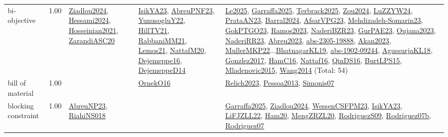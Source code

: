 {\begin{longtable}{p{3cm}r>{\raggedright\arraybackslash}p{6cm}>{\raggedright\arraybackslash}p{6cm}>{\raggedright\arraybackslash}p{8cm}}
\index{bi-objective}\index{Concepts!bi-objective}bi-objective &  1.00 & \hyperref[detail:Ziadlou2024]{Ziadlou2024}, \hyperref[detail:Hessami2024]{Hessami2024}, \hyperref[detail:Hosseinian2021]{Hosseinian2021}, \hyperref[detail:ZarandiASC20]{ZarandiASC20} & \hyperref[detail:IsikYA23]{IsikYA23}, \hyperref[detail:AbreuPNF23]{AbreuPNF23}, \hyperref[detail:YunusogluY22]{YunusogluY22}, \hyperref[detail:HillTV21]{HillTV21}, \hyperref[detail:RabbaniMM21]{RabbaniMM21}, \hyperref[detail:Lemos21]{Lemos21}, \hyperref[detail:NattafM20]{NattafM20}, \hyperref[detail:Dejemeppe16]{Dejemeppe16}, \hyperref[detail:DejemeppeD14]{DejemeppeD14} & \hyperref[detail:Le2025]{Le2025}, \hyperref[detail:Garraffa2025]{Garraffa2025}, \hyperref[detail:Terbrack2025]{Terbrack2025}, \hyperref[detail:Zou2024]{Zou2024}, \hyperref[detail:LuZZYW24]{LuZZYW24}, \hyperref[detail:PrataAN23]{PrataAN23}, \hyperref[detail:Barral2024]{Barral2024}, \hyperref[detail:AfsarVPG23]{AfsarVPG23}, \hyperref[detail:Mehdizadeh-Somarin23]{Mehdizadeh-Somarin23}, \hyperref[detail:GokPTGO23]{GokPTGO23}, \hyperref[detail:Ramos2023]{Ramos2023}, \hyperref[detail:NaderiBZR23]{NaderiBZR23}, \hyperref[detail:GurPAE23]{GurPAE23}, \hyperref[detail:Oujana2023]{Oujana2023}, \hyperref[detail:NaderiRR23]{NaderiRR23}, \hyperref[detail:Abreu2023]{Abreu2023}, \hyperref[detail:abs-2305-19888]{abs-2305-19888}, \hyperref[detail:Akan2023]{Akan2023}, \hyperref[detail:MullerMKP22]{MullerMKP22}...\hyperref[detail:BhatnagarKL19]{BhatnagarKL19}, \hyperref[detail:abs-1902-09244]{abs-1902-09244}, \hyperref[detail:AgussurjaKL18]{AgussurjaKL18}, \hyperref[detail:Gonzlez2017]{Gonzlez2017}, \hyperref[detail:HamC16]{HamC16}, \hyperref[detail:Nattaf16]{Nattaf16}, \hyperref[detail:QinDS16]{QinDS16}, \hyperref[detail:BurtLPS15]{BurtLPS15}, \hyperref[detail:Mladenovic2015]{Mladenovic2015}, \hyperref[detail:Wang2014]{Wang2014} (Total: 54)\\
\index{bill of material}\index{Concepts!bill of material}bill of material &  1.00 &  & \hyperref[detail:OrnekO16]{OrnekO16} & \hyperref[detail:Relich2023]{Relich2023}, \hyperref[detail:Pessoa2013]{Pessoa2013}, \hyperref[detail:Simonis07]{Simonis07}\\
\index{blocking constraint}\index{Concepts!blocking constraint}blocking constraint &  1.00 & \hyperref[detail:AbreuNP23]{AbreuNP23}, \hyperref[detail:RiahiNS018]{RiahiNS018} &  & \hyperref[detail:Garraffa2025]{Garraffa2025}, \hyperref[detail:Ziadlou2024]{Ziadlou2024}, \hyperref[detail:WessenCSFPM23]{WessenCSFPM23}, \hyperref[detail:IsikYA23]{IsikYA23}, \hyperref[detail:LiFJZLL22]{LiFJZLL22}, \hyperref[detail:Ham20]{Ham20}, \hyperref[detail:MengZRZL20]{MengZRZL20}, \hyperref[detail:RodriguezS09]{RodriguezS09}, \hyperref[detail:Rodriguez07b]{Rodriguez07b}, \hyperref[detail:Rodriguez07]{Rodriguez07}\\

\end{longtable}}
